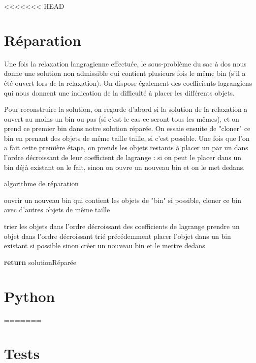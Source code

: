 \documentclass{article}
\begin{document}
<<<<<<< HEAD
\section{Réparation}

Une fois la relaxation langragienne effectuée, le sous-problème du sac à dos nous donne une solution non admissible qui contient plusieurs fois le même bin (s'il a été ouvert lors de la relaxation). On dispose également des coefficients lagrangiens qui nous donnent une indication de la difficulté à placer les différents objets. 

Pour reconstruire la solution, on regarde d'abord si la solution de la relaxation a ouvert au moins un bin ou pas (si c'est le cas ce seront tous les mêmes), et on prend ce premier bin dans notre solution réparée. On essaie ensuite de "cloner" ce bin en prenant des objets de même taille taille, si c'est possible. Une fois que l'on a fait cette première étape, on prends les objets restants à placer un par un dans l'ordre décroissant de leur coefficient de lagrange : si on peut le placer dans un bin déjà existant on le fait, sinon on ouvre un nouveau bin et on le met dedans.

\begin{algorithm}
	\caption{algorithme de réparation}
	\begin{algorithmic}[1]
		\State ouvrir un nouveau bin qui contient les objets de "bin"
		\State si possible, cloner ce bin avec d'autres objets de même taille
		\EndIf
		
		\State trier les objets dans l'ordre décroissant des coefficients de lagrange
		\State prendre un objet dans l'ordre décroissant trié précédemment
		\State placer l'objet dans un bin existant si possible
		\State sinon créer un nouveau bin et le mettre dedans
		\EndWhile
		
		\State \textbf{return} solutionRéparée
		\EndFunction
	\end{algorithmic}
\end{algorithm}


\section{Python}
=======
\section{Tests}
\end{document}
